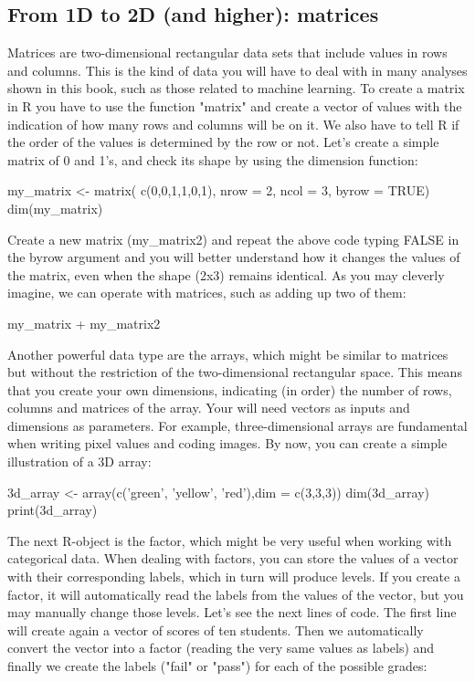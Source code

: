 \subsection{From 1D to 2D (and higher): matrices}






Matrices are two-dimensional rectangular data sets that include values in rows and columns. This is the kind of data you will have to deal with in many analyses shown in this book, such as those related to machine learning.  To create a matrix in R you have to use the function "matrix" and create a vector of values with the indication of how many rows and columns will be on it. We also have to tell R if the order of the values is determined by the row or not.  Let’s create a simple matrix of 0 and 1’s, and check its shape by using the dimension function:

\begin{exampler}
my_matrix <- matrix( c(0,0,1,1,0,1), nrow = 2, ncol = 3, byrow = TRUE)
dim(my_matrix)
\end{exampler}

Create a new matrix (my\_matrix2) and repeat the above code typing FALSE in the byrow argument and you will better understand how it changes the values of the matrix, even when the shape (2x3) remains identical. As you may cleverly imagine, we can operate with matrices, such as adding up two of them:

\begin{exampler}
my_matrix + my_matrix2
\end{exampler}

Another powerful data type are the arrays, which might be similar to matrices but without the restriction of the two-dimensional rectangular space. This means that you create your own dimensions, indicating (in order) the number of rows, columns and matrices of the array. Your will need vectors as inputs and dimensions as parameters. For example, three-dimensional arrays are fundamental when writing pixel values and coding images.  By now, you can create a simple illustration of a 3D array:

\begin{exampler}
3d_array <- array(c('green', 'yellow', 'red'),dim = c(3,3,3))
dim(3d_array)
print(3d_array)
\end{exampler}

The next R-object is the factor, which might be very useful when working with categorical data. When dealing with factors, you can store the values of a vector with their corresponding labels, which in turn will produce levels. If you create a factor, it will automatically read the labels from the values of the vector, but you may manually change those levels. Let's see the next lines of code. The first line will create again a vector of scores of ten students. Then we automatically convert the vector into a factor (reading the very same values as labels) and finally we create the labels ("fail" or "pass") for each of the possible grades:

